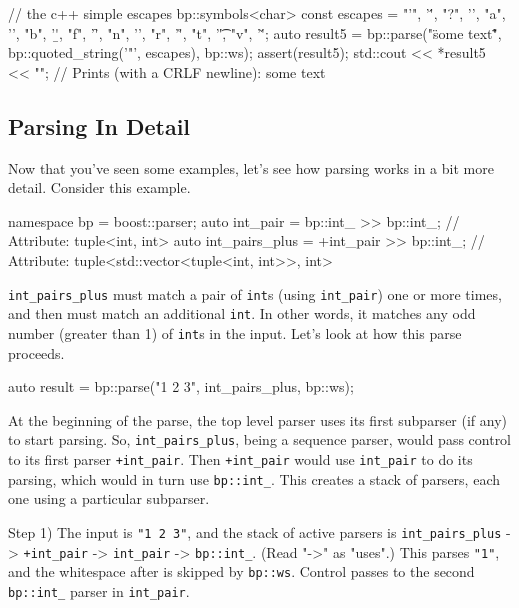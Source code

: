\begin{code}
// the c++ simple escapes
bp::symbols<char> const escapes = {
    {"'", '\''},
    {"?", '\?'},
    {"a", '\a'},
    {"b", '\b'},
    {"f", '\f'},
    {"n", '\n'},
    {"r", '\r'},
    {"t", '\t'},
    {"v", '\v'}};
auto result5 =
    bp::parse("\"some text\r\"", bp::quoted_string('"', escapes), bp::ws);
assert(result5);
std::cout << *result5 << "\n"; // Prints (with a CRLF newline): some text
\end{code}

\label{tutorial_split_002.html}{}

\subsection{Parsing In Detail}

Now that you've seen some examples, let's see how parsing works in a bit more detail. Consider this example.

\begin{code}
namespace bp = boost::parser;
auto int_pair = bp::int_ >> bp::int_;         // Attribute: tuple<int, int>
auto int_pairs_plus = +int_pair >> bp::int_;  // Attribute: tuple<std::vector<tuple<int, int>>, int>
\end{code}

\texttt{int\_pairs\_plus} must match a pair of \texttt{int}s (using \texttt{int\_pair}) one or more times, and then must match an additional \texttt{int}. In other words, it matches any odd number (greater than 1) of \texttt{int}s in the input. Let's look at how this parse proceeds.

\begin{code}
auto result = bp::parse("1 2 3", int_pairs_plus, bp::ws);
\end{code}

At the beginning of the parse, the top level parser uses its first subparser (if any) to start parsing. So, \texttt{int\_pairs\_plus}, being a sequence parser, would pass control to its first parser \texttt{+int\_pair}. Then \texttt{+int\_pair} would use \texttt{int\_pair} to do its parsing, which would in turn use \texttt{bp::int\_}. This creates a stack of parsers, each one using a particular subparser.

Step 1) The input is \texttt{"1 2 3"}, and the stack of active parsers is \texttt{int\_pairs\_plus} -> \texttt{+int\_pair} -> \texttt{int\_pair} -> \texttt{bp::int\_}. (Read "-\textgreater" as "uses".) This parses \texttt{"1"}, and the whitespace after is skipped by \texttt{bp::ws}. Control passes to the second \texttt{bp::int\_} parser in \texttt{int\_pair}.

